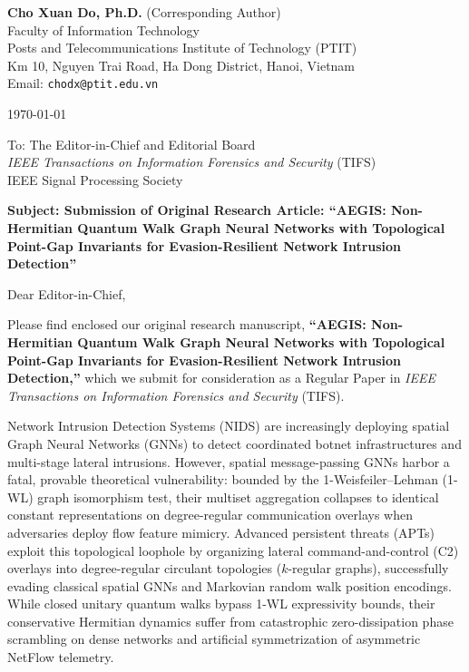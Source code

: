 \documentclass[10pt,a4paper]{article}
\begin{document}
\begin{flushleft}
\textbf{Cho Xuan Do, Ph.D.} (Corresponding Author) \\
Faculty of Information Technology \\
Posts and Telecommunications Institute of Technology (PTIT) \\
Km 10, Nguyen Trai Road, Ha Dong District, Hanoi, Vietnam \\
Email: \texttt{chodx@ptit.edu.vn}
\end{flushleft}

\vspace{1em}
\today

\vspace{1em}
To: The Editor-in-Chief and Editorial Board \\
\textit{IEEE Transactions on Information Forensics and Security} (TIFS) \\
IEEE Signal Processing Society

\vspace{1em}
\textbf{Subject: Submission of Original Research Article: ``AEGIS: Non-Hermitian Quantum Walk Graph Neural Networks with Topological Point-Gap Invariants for Evasion-Resilient Network Intrusion Detection''}

Dear Editor-in-Chief,

Please find enclosed our original research manuscript, \textbf{``AEGIS: Non-Hermitian Quantum Walk Graph Neural Networks with Topological Point-Gap Invariants for Evasion-Resilient Network Intrusion Detection,''} which we submit for consideration as a Regular Paper in \textit{IEEE Transactions on Information Forensics and Security} (TIFS).

Network Intrusion Detection Systems (NIDS) are increasingly deploying spatial Graph Neural Networks (GNNs) to detect coordinated botnet infrastructures and multi-stage lateral intrusions. However, spatial message-passing GNNs harbor a fatal, provable theoretical vulnerability: bounded by the 1-Weisfeiler--Lehman (1-WL) graph isomorphism test, their multiset aggregation collapses to identical constant representations on degree-regular communication overlays when adversaries deploy flow feature mimicry. Advanced persistent threats (APTs) exploit this topological loophole by organizing lateral command-and-control (C2) overlays into degree-regular circulant topologies ($k$-regular graphs), successfully evading classical spatial GNNs and Markovian random walk position encodings. While closed unitary quantum walks bypass 1-WL expressivity bounds, their conservative Hermitian dynamics suffer from catastrophic zero-dissipation phase scrambling on dense networks and artificial symmetrization of asymmetric NetFlow telemetry.
\end{document}
